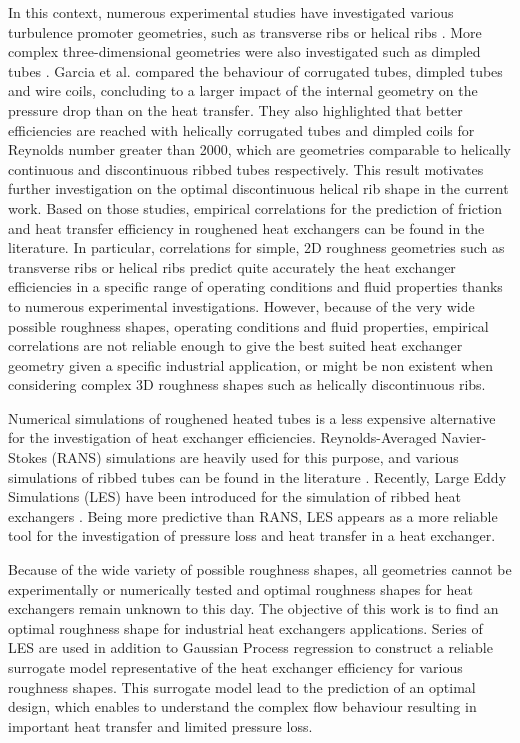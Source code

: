 In this context, numerous experimental studies have investigated various turbulence promoter geometries, such as transverse ribs \cite{webb1971, aliaga1994} or helical ribs \cite{gee1980, VicenteGarciaViedma2004, cheng2006, Mayo2016}. More complex three-dimensional geometries were also investigated such as dimpled tubes \cite{VicenteGarciaViedma2002}. Garcia et al. \cite{GarciaSolanoVicenteEtAl2012} compared the behaviour of corrugated tubes, dimpled tubes and wire coils, concluding to a larger impact of the internal geometry on the pressure drop than on the heat transfer. They also highlighted that better efficiencies are reached with helically corrugated tubes and dimpled coils for Reynolds number greater than 2000, which are geometries comparable to helically continuous and discontinuous ribbed tubes respectively. This result motivates further investigation on the optimal discontinuous helical rib shape in the current work. Based on those studies, empirical correlations for the prediction of friction and heat transfer efficiency in roughened heat exchangers can be found in the literature. In particular, correlations for simple, 2D roughness geometries such as transverse ribs or helical ribs predict quite accurately the heat exchanger efficiencies in a specific range of operating conditions and fluid properties thanks to numerous experimental investigations. However, because of the very wide possible roughness shapes, operating conditions and fluid properties, empirical correlations are not reliable enough to give the best suited heat exchanger geometry given a specific industrial application, or might be non existent when considering complex 3D roughness shapes such as helically discontinuous ribs.

Numerical simulations of roughened heated tubes is a less expensive alternative for the investigation of heat exchanger efficiencies. Reynolds-Averaged Navier-Stokes (RANS) simulations are heavily used for this purpose, and various simulations of ribbed tubes can be found in the literature \cite{liou1993, shub1993, liu2001, ooi2002, iaccarino2002, liou2002, kim2004, kim_hm2004, ryu2007_a, ryu2007_b, kamali2008, eiamsaard2008, agra2011, ma2012}. Recently, Large Eddy Simulations (LES) have been introduced for the simulation of ribbed heat exchangers \cite{jordan2003, vijiapurapu2007, vijiapurapu2010, Zhu2015, campet2018}. Being more predictive than RANS, LES appears as a more reliable tool for the investigation of pressure loss and heat transfer in a heat exchanger.

Because of the wide variety of possible roughness shapes, all geometries cannot be experimentally or numerically tested and optimal roughness shapes for heat exchangers remain unknown to this day. The objective of this work is to find an optimal roughness shape for industrial heat exchangers applications. Series of LES are used in addition to Gaussian Process regression \cite{rasmussen2006} to construct a reliable surrogate model representative of the heat exchanger efficiency for various roughness shapes. This surrogate model lead to the prediction of an optimal design, which enables to understand the complex flow behaviour resulting in important heat transfer and limited pressure loss.


